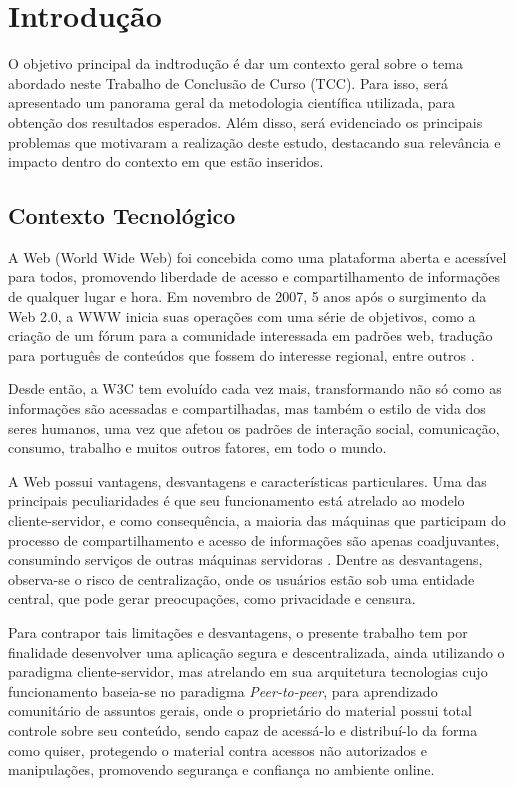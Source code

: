 \chapter[Introdução]{Introdução}


O objetivo principal da indtrodução é dar um contexto geral sobre o tema abordado neste Trabalho de Conclusão de Curso (TCC). Para isso, será apresentado um panorama geral da metodologia científica utilizada, para obtenção dos resultados esperados. Além disso, será evidenciado os principais problemas que motivaram a realização deste estudo, destacando sua relevância e impacto dentro do contexto em que estão inseridos. 

\section{Contexto Tecnológico}

A Web (World Wide Web) foi concebida como uma plataforma aberta e acessível para todos, promovendo liberdade de acesso e compartilhamento de informações de qualquer lugar e hora. Em novembro de 2007, 5 anos após o surgimento da Web 2.0, a WWW inicia suas operações com uma série de objetivos, como a criação de um fórum para a comunidade interessada em padrões web, tradução para português de conteúdos que fossem do interesse regional, entre outros \cite{vieira2014}.

Desde então, a W3C tem evoluído cada vez mais, transformando não só como as informações são acessadas e compartilhadas, mas também o estilo de vida dos seres humanos, uma vez que afetou os padrões de interação social, comunicação, consumo, trabalho e muitos outros fatores, em todo o mundo.

A Web possui vantagens, desvantagens e características particulares. Uma das principais peculiaridades é que seu funcionamento está atrelado ao modelo cliente-servidor, e como consequência, a maioria das máquinas que participam do processo de compartilhamento e acesso de informações são apenas coadjuvantes, consumindo serviços de outras máquinas servidoras \cite{rocha2004p2p}. Dentre as desvantagens, observa-se o risco de centralização, onde os usuários estão sob uma entidade central, que pode gerar preocupações, como privacidade e censura. 

Para contrapor tais limitações e desvantagens, o presente trabalho tem por finalidade desenvolver uma aplicação segura e descentralizada, ainda utilizando o paradigma cliente-servidor, mas atrelando em sua arquitetura tecnologias cujo funcionamento baseia-se no paradigma \textit{Peer-to-peer}, para aprendizado comunitário de assuntos gerais, onde o proprietário do material possui total controle sobre seu conteúdo, sendo capaz de acessá-lo e distribuí-lo da forma como quiser, protegendo o material contra acessos não autorizados e manipulações, promovendo segurança e confiança no ambiente online.

